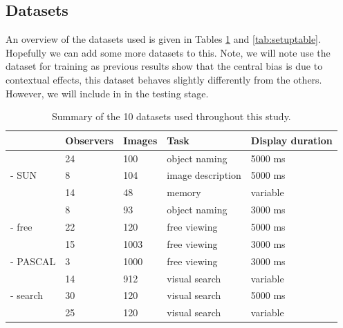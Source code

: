 \documentclass[a4paper, onecolumn, oneside, 11pt]{article}
\begin{document}
\subsection{Datasets}

An overview of the datasets used is given in Tables \ref{tab:datasets} and \ref{tab:setuptable}. Hopefully we can add some more datasets to this. Note, we will note use the \cite{ehinger2009} dataset for training as previous results show that the central bias is due to contextual effects, this dataset behaves slightly differently from the others. However, we will include in in the testing stage. 


\begin{table}
\centering
\small
\begin{tabular}{l|llll}
 & Observers & Images &  Task & Display duration\\
\hline
\cite{clarke2013}     & 24    & 100   & object naming        & 5000 ms\\
\cite{yun2013} - SUN        & 8     & 104   & image description    & 5000 ms\\
\cite{tatler2005}     & 14    & 48     & memory & variable\\
\cite{einhauser2008} & 8    & 93      & object naming & 3000 ms \\
\hline
\cite{tatler2007} - free    & 22    & 120   & free viewing          & 5000 ms\\
\cite{judd2009}         & 15 & 1003      & free viewing & 3000 ms\\
\cite{yun2013} - PASCAL        & 3 & 1000  & free viewing & 3000 ms\\
\hline
\cite{ehinger2009}     & 14 & 912 &  visual search & variable\\
\cite{tatler2007} - search    & 30 & 120 &   visual search & 5000 ms\\
\cite{asher2013}    & 25    & 120      & visual search & variable\\
\end{tabular}

\caption{Summary of the 10 datasets used throughout this study.}
\label{tab:datasets}
\end{table}
\end{document}
